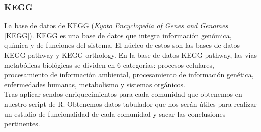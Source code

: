 \subsubsection{KEGG}
La base de datos de KEGG (\textit{Kyoto Encyclopedia of Genes and Genomes} \ref{KEGG}). KEGG es una base de datos que integra información genómica, química y de funciones del sistema. El núcleo de estos son las bases de datos KEGG pathway y KEGG orthology. En la base de datos KEGG pathway, las vías metabólicas biológicas se dividen en 6 categorías: procesos celulares, procesamiento de información ambiental, procesamiento de información genética, enfermedades humanas, metabolismo y sistemas orgánicos. \\

Tras aplicar sendos enriquecimientos para cada comunidad que obtenemos en nuestro script de R. Obtenemos datos tabulador que nos serán útiles para realizar un estudio de funcionalidad de cada comunidad y sacar las conclusiones pertinentes.